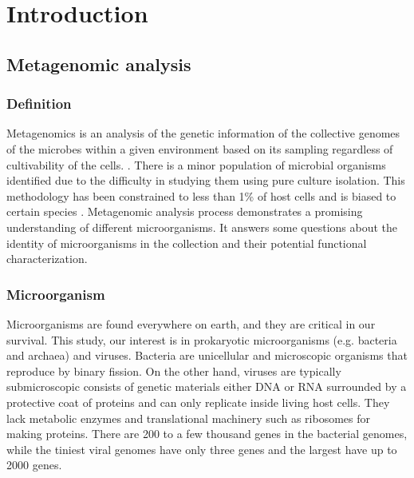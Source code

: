 
\chapter{Introduction} %

\label{Chapter1} %



\section{Metagenomic analysis}

\subsection{Definition}

{M}{etagenomics} is an analysis of the genetic information of the collective genomes of the microbes within a given environment based on its sampling regardless of cultivability of the cells. \cite{izard2014metagenomics}. There is a minor population of microbial organisms identified due to the difficulty in studying them using pure culture isolation. This methodology has been constrained to less than 1\% of host cells and is biased to certain species \cite{labonte2015single}.
Metagenomic analysis process demonstrates a promising understanding of different microorganisms. It answers some questions about the identity of microorganisms in the collection and their potential functional characterization.

\subsection{Microorganism}


Microorganisms are found everywhere on earth, and they are critical in our survival. This study, our interest is in prokaryotic microorganisms (e.g. bacteria and archaea) and viruses. Bacteria are unicellular and microscopic organisms that reproduce by binary fission. On the other hand, viruses are typically submicroscopic consists of genetic materials either DNA or RNA surrounded by a protective coat of proteins and can only replicate inside living host cells. They lack metabolic enzymes and translational machinery such as ribosomes for making proteins. There are 200 to a few thousand genes in the bacterial genomes, while the tiniest viral genomes have only three genes and the largest have up to 2000 genes.


